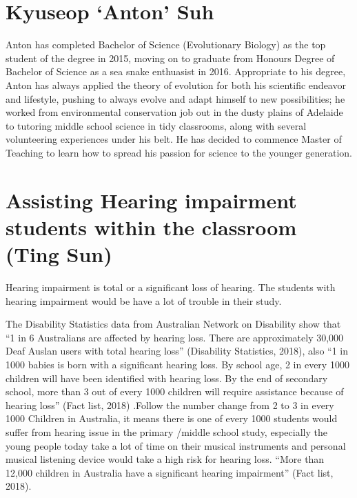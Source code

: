 \documentclass[twoside,14pt,a4paper,notitlepage]{memoir}
\begin{document}
\section*{Kyuseop `Anton' Suh}

Anton has completed Bachelor of Science (Evolutionary Biology) as the top student of the degree in 2015, moving on to graduate from Honours Degree of Bachelor of Science as a sea snake enthuasist in 2016. Appropriate to his degree, Anton has always applied the theory of evolution for both his scientific endeavor and lifestyle, pushing to always evolve and adapt himself to new possibilities; he worked from environmental conservation job out in the dusty plains of Adelaide to tutoring middle school science in tidy classrooms, along with several volunteering experiences under his belt. He has decided to commence Master of Teaching to learn how to spread his passion for science to the younger generation.



\section*{Assisting Hearing impairment students within the classroom (Ting Sun)}
\label{aut:sun}

Hearing impairment is total or a significant loss of hearing. The students with hearing impairment would be have a lot of trouble in their study. 
 
The Disability Statistics data from Australian Network on Disability show that “1 in 6 Australians are affected by hearing loss. There are approximately 30,000 Deaf Auslan users with total hearing loss” (Disability Statistics, 2018), also “1 in 1000 babies is born with a significant hearing loss. By school age, 2 in every 1000 children will have been identified with hearing loss. By the end of secondary school, more than 3 out of every 1000 children will require assistance because of hearing loss” (Fact list, 2018) .Follow the number change from 2 to 3 in every 1000 Children in Australia, it means there is one of every 1000 students would suffer from hearing issue in the primary /middle school study, especially the young people today take a lot of time on their musical instruments and personal musical listening device would take a high risk for hearing loss. “More than 12,000 children in Australia have a significant hearing impairment” (Fact list, 2018).
 
\end{document}
